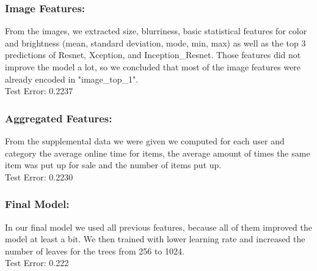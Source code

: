 \documentclass[runningheads]{llncs}
\begin{document}
\subsubsection{Image Features:} From the images, we extracted size, blurriness, basic statistical features for color and brightness (mean, standard deviation, mode, min, max) as well as the top 3 predictions of Resnet, Xception, and Inception\_Resnet. Those features did not improve the model a lot, so we concluded that most of the image features were already encoded in "image\_top\_1".\\
Test Error: 0.2237 
\subsubsection{Aggregated Features:} From the supplemental data we were given we computed for each user and category the average online time for items, the average amount of times the same item was put up for sale and the number of items put up.\\
Test Error: 0.2230
\subsubsection{Final Model:} In our final model we used all previous features, because all of them improved the model at least a bit. We then trained with lower learning rate and increased the number of leaves for the trees from 256 to 1024.\\
Test Error: 0.222
\end{document}
